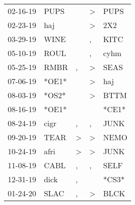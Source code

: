 \begin{supertabular}{p{0.07\textwidth}p{0.06\textwidth}p{0.02\textwidth}p{0.02\textwidth}p{0.06\textwidth}}
          02-16-19\textsuperscript{} &           PUPS\textsuperscript{} &                  &     \textgreater &           PUPS\textsuperscript{} \\
          02-23-19\textsuperscript{} &            haj\textsuperscript{} &                  &     \textgreater &            2X2\textsuperscript{} \\
          03-29-19\textsuperscript{} &           WINE\textsuperscript{} &                  &                , &           KITC\textsuperscript{} \\
          05-10-19\textsuperscript{} &           ROUL\textsuperscript{} &                  &                , &           cyhm\textsuperscript{} \\
          05-25-19\textsuperscript{} &           RMBR\textsuperscript{} &                , &     \textgreater &           SEAS\textsuperscript{} \\
          07-06-19\textsuperscript{} &                            *OE1* &                  &     \textgreater &            haj\textsuperscript{} \\
          08-03-19\textsuperscript{} &                            *OS2* &                  &     \textgreater &           BTTM\textsuperscript{} \\
          08-16-19\textsuperscript{} &                            *OE1* &                  &                  &                            *CE1* \\
          08-24-19\textsuperscript{} &           cigr\textsuperscript{} &                , &                , &           JUNK\textsuperscript{} \\
          09-20-19\textsuperscript{} &           TEAR\textsuperscript{} &     \textgreater &     \textgreater &           NEMO\textsuperscript{} \\
          10-24-19\textsuperscript{} &           afri\textsuperscript{} &     \textgreater &     \textgreater &           JUNK\textsuperscript{} \\
          11-08-19\textsuperscript{} &           CABL\textsuperscript{} &                , &                , &           SELF\textsuperscript{} \\
          12-31-19\textsuperscript{} &           dick\textsuperscript{} &                , &                  &                            *CS3* \\
          01-24-20\textsuperscript{} &           SLAC\textsuperscript{} &                , &     \textgreater &           BLCK\textsuperscript{} \\

\end{supertabular}

